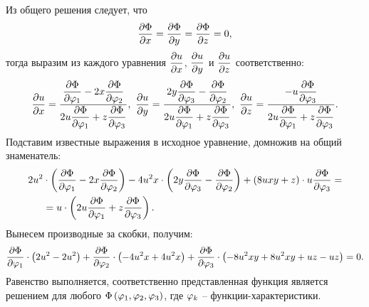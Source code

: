 		Из общего решения следует, что
		\[ \dpart{\Phi}{x} = \dpart{\Phi}{y} = \dpart{\Phi}{z} = 0, \]
		тогда выразим из каждого уравнения \( \dpart{u}{x} \), \( \dpart{u}{y} \) и \( \dpart{u}{z} \) соответственно:
		\[
			\dpart{u}{x} = \frac{\dpart{\Phi}{\vp_1} - 2x \dpart{\Phi}{\vp_2}}{2u \dpart{\Phi}{\vp_1} + z \dpart{\Phi}{\vp_3}}, ~
			\dpart{u}{y} = \frac{2y \dpart{\Phi}{\vp_3} - \dpart{\Phi}{\vp_2}}{2u \dpart{\Phi}{\vp_1} + z \dpart{\Phi}{\vp_3}}, ~
			\dpart{u}{z} = \frac{- u \dpart{\Phi}{\vp_3}}{2u \dpart{\Phi}{\vp_1} + z \dpart{\Phi}{\vp_3}}.
		\] 
		Подставим известные выражения в исходное уравнение, домножив на общий знаменатель:
		\[ \begin{split}
			2u^2 &\cdot \pares{
				\dpart{\Phi}{\vp_1} - 2x \dpart{\Phi}{\vp_2}
			} - 4 u^2 x \cdot \pares{
				2y \dpart{\Phi}{\vp_3} - \dpart{\Phi}{\vp_2}
			} + \pares{ 8uxy + z } \cdot 
				u \dpart{\Phi}{\vp_3} 
			= \\
			&= u \cdot \pares{
				2u \dpart{\Phi}{\vp_1} + z \dpart{\Phi}{\vp_3}
			}. 
		\end{split} \]
		Вынесем производные за скобки, получим:
		\[ \dpart{\Phi}{\vp_1} \cdot \pares{2u^2 - 2u^2} + \dpart{\Phi}{\vp_2} \cdot \pares{-4u^2 x + 4u^2 x} + \dpart{\Phi}{\vp_3} \cdot \pares{- 8u^2 x y + 8u^2 x y + uz - uz} = 0. \]
		Равенство выполняется, соответственно представленная функция является решением для любого $\Phi \pares{\vp_1, \vp_2, \vp_3}$, где $\vp_k$ -- функции-характеристики.

